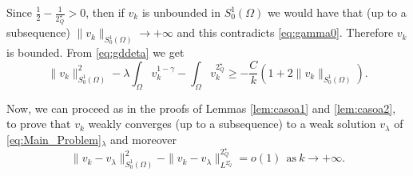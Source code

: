 \documentclass[11pt]{amsart}
\numberwithin{equation}{section} %
\theoremstyle{definition}
\newcommand{\m}{\mbox}
\begin{document}
Since $\frac{1}{2}-\frac{1}{2^\star_Q}>0$, 
then if $v_k$ is unbounded in $S^1_0(\Omega)$
we would have that (up to a subsequence) $\|v_k\|_{S^{1}_{0}(\Omega)}\to+\infty$
and this contradicts \eqref{eq:gamma0}.
Therefore $v_k$ is bounded.
From \eqref{eq:gddeta} we get
\begin{equation}\label{eq:last}
	\|v_k\|_{S^{1}_{0}(\Omega)}^2-\lambda\int_\Omega v_k^{1-\gamma}-\int_\Omega v_k^{2^\star_Q}\geq
	-\frac{C}{k}(1+2\|v_k\|_{S^{1}_{0}(\Omega)}).
\end{equation}
\color{black}

Now, we can proceed as in 
the proofs of Lemmas \ref{lem:casoa1} and \ref{lem:casoa2},
to prove that
$v_k$ weakly converges (up to a subsequence) to a weak solution $v_\lambda$
of \eqref{eq:Main_Problem}$_\lambda$ and moreover
\begin{equation}\label{eq:convergence}
	\|v_k-v_\lambda\|_{S^{1}_{0}(\Omega)}^2-\|v_k-v_\lambda\|_{L^{2^\star_Q}}^{2^\star_Q}=o(1)\ \ \m{as}\ k\to+\infty.
\end{equation}
\end{document}
